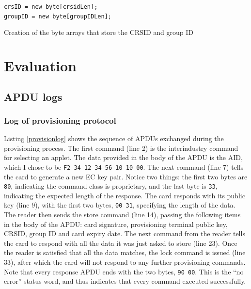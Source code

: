 \documentclass[12pt,a4paper,twoside,openright]{report}
\begin{document}
\begin{listing}
\begin{verbatim}
crsID = new byte[crsidLen];
groupID = new byte[groupIDLen];
\end{verbatim}
\caption{Creation of the byte arrays that store the CRSID and group ID}
\label{crsidgroupcreation}
\end{listing}

\chapter{Evaluation}

\section{APDU logs}

\subsection{Log of provisioning protocol}

Listing \autoref{provisionlog} shows the sequence of APDUs exchanged during the provisioning process. The first command (line 2) is the interindustry command for selecting an applet. The data provided in the body of the APDU is the AID, which I chose to be \texttt{F2 34 12 34 56 10 10 00}. The next command (line 7) tells the card to generate a new EC key pair. Notice two things: the first two bytes are \texttt{80}, indicating the command class is proprietary, and the last byte is \texttt{33}, indicating the expected length of the response. The card responds with its public key (line 9), with the first two bytes, \texttt{00 31}, specifying the length of the data. The reader then sends the store command (line 14), passing the following items in the body of the APDU: card signature, provisioning terminal public key, CRSID, group ID and card expiry date. The next command from the reader tells the card to respond with all the data it was just asked to store (line 23). Once the reader is satisfied that all the data matches, the lock command is issued (line 33), after which the card will not respond to any further provisioning commands. Note that every response APDU ends with the two bytes, \texttt{90 00}. This is the ``no error'' status word, and thus indicates that every command executed successfully.
\end{document}
